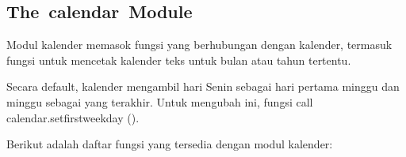 \documentclass[a4paper,12pt]{report}
\begin{document}


\vspace{20pt}
\subsection*{The calendar Module}
 \par
\begin{adjustwidth}{0.03in}{0.03in}
Modul kalender memasok fungsi yang berhubungan dengan kalender, termasuk fungsi untuk mencetak kalender teks untuk bulan atau tahun tertentu.\end{adjustwidth}
 \par
\begin{adjustwidth}{0.03in}{0.03in}
Secara default, kalender mengambil hari Senin sebagai hari pertama minggu dan minggu sebagai yang terakhir. Untuk mengubah ini, fungsi call calendar.setfirstweekday ().\end{adjustwidth}
 \par
\begin{adjustwidth}{0.03in}{0.03in}
Berikut adalah daftar fungsi yang tersedia dengan modul kalender:\end{adjustwidth}
 \par
\vspace{12pt}


\end{document}
